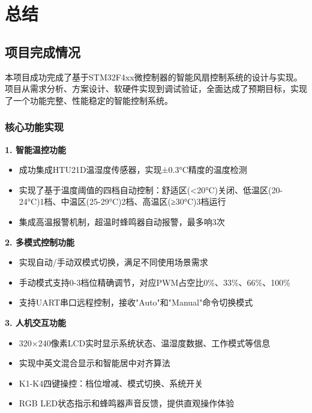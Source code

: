\section{总结}

\subsection{项目完成情况}

\qquad 本项目成功完成了基于STM32F4xx微控制器的智能风扇控制系统的设计与实现。项目从需求分析、方案设计、软硬件实现到调试验证，全面达成了预期目标，实现了一个功能完整、性能稳定的智能控制系统。

\subsubsection{核心功能实现}

\textbf{1. 智能温控功能}
\begin{itemize}
    \vspace{-6pt}
  \item 成功集成HTU21D温湿度传感器，实现±0.3°C精度的温度检测
    \vspace{-6pt}
  \item 实现了基于温度阈值的四档自动控制：舒适区(<20°C)关闭、低温区(20-24°C)1档、中温区(25-29°C)2档、高温区(≥30°C)3档运行
    \vspace{-6pt}
  \item 集成高温报警机制，超温时蜂鸣器自动报警，最多响3次
\end{itemize}

\textbf{2. 多模式控制功能}
\begin{itemize}
    \vspace{-6pt}
  \item 实现自动/手动双模式切换，满足不同使用场景需求
    \vspace{-6pt}
  \item 手动模式支持0-3档位精确调节，对应PWM占空比0\%、33\%、66\%、100\%
    \vspace{-6pt}
  \item 支持UART串口远程控制，接收"Auto"和"Manual"命令切换模式
\end{itemize}

\textbf{3. 人机交互功能}
\begin{itemize}
    \vspace{-6pt}
  \item 320×240像素LCD实时显示系统状态、温湿度数据、工作模式等信息
    \vspace{-6pt}
  \item 实现中英文混合显示和智能居中对齐算法
    \vspace{-6pt}
  \item K1-K4四键操控：档位增减、模式切换、系统开关
    \vspace{-6pt}
  \item RGB LED状态指示和蜂鸣器声音反馈，提供直观操作体验
\end{itemize}

